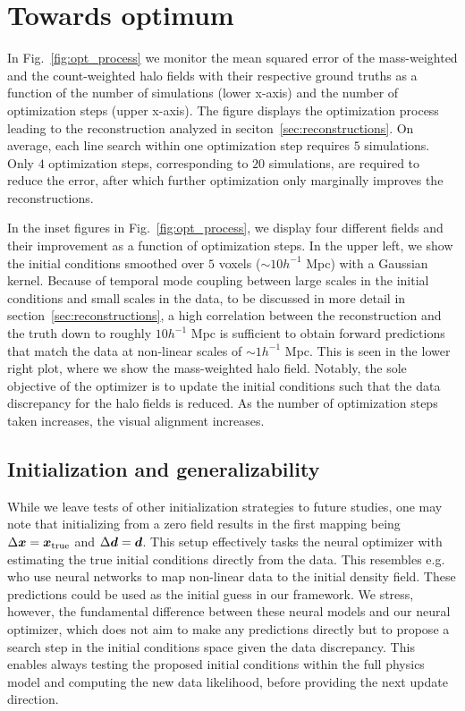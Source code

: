 \section{Towards optimum}
\label{app:towards_opt}

In Fig.~\ref{fig:opt_process} we monitor the mean squared error of the mass-weighted and the count-weighted halo fields with their respective ground truths as a function of the number of simulations (lower x-axis) and the number of optimization steps (upper x-axis). The figure displays the optimization process leading to the reconstruction analyzed in seciton~\ref{sec:reconstructions}. On average, each line search within one optimization step requires $5$ simulations. Only $4$ optimization steps, corresponding to $20$ simulations, are required to reduce the error, after which further optimization only marginally improves the reconstructions. 

In the inset figures in Fig.~\ref{fig:opt_process}, we display four different fields and their improvement as a function of optimization steps. In the upper left, we show the initial conditions smoothed over $5$ voxels ($\sim10h^{-1}$ Mpc) with a Gaussian kernel. Because of temporal mode coupling between large scales in the initial conditions and small scales in the data, to be discussed in more detail in section~\ref{sec:reconstructions}, a high correlation between the reconstruction and the truth down to roughly $10h^{-1}$ Mpc is sufficient to obtain forward predictions that match the data at non-linear scales of $\sim 1h^{-1}$ Mpc. This is seen in the lower right plot, where we show the mass-weighted halo field. Notably, the sole objective of the optimizer is to update the initial conditions such that the data discrepancy for the halo fields is reduced. As the number of optimization steps taken increases, the visual alignment increases.

\subsection{Initialization and generalizability}
While we leave tests of other initialization strategies to future studies, one may note that initializing from a zero field results in the first mapping being $\Delta \boldsymbol{x} = \boldsymbol{x}_{\mathrm{true}}$ and $\Delta \boldsymbol{d} = \boldsymbol{d}$. This setup effectively tasks the neural optimizer with estimating the true initial conditions directly from the data. This resembles e.g. \citet{Shallue2023,Jindal2023,Chen2023,Legin2023} who use neural networks to map non-linear data to the initial density field. These predictions could be used as the initial guess in our framework. We stress, however, the fundamental difference between these neural models and our neural optimizer, which does not aim to make any predictions directly but to propose a search step in the initial conditions space given the data discrepancy. This enables always testing the proposed initial conditions within the full physics model and computing the new data likelihood, before providing the next update direction. 

